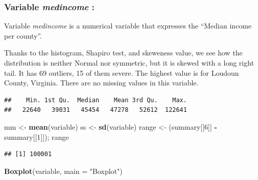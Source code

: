 \documentclass[
]{article}
\newenvironment{Shaded}{\begin{snugshade}}{\end{snugshade}}
\newcommand{\AttributeTok}[1]{\textcolor[rgb]{0.13,0.29,0.53}{#1}}
\newcommand{\DecValTok}[1]{\textcolor[rgb]{0.00,0.00,0.81}{#1}}
\newcommand{\FunctionTok}[1]{\textcolor[rgb]{0.13,0.29,0.53}{\textbf{#1}}}
\newcommand{\NormalTok}[1]{#1}
\newcommand{\OtherTok}[1]{\textcolor[rgb]{0.56,0.35,0.01}{#1}}
\newcommand{\SpecialCharTok}[1]{\textcolor[rgb]{0.81,0.36,0.00}{\textbf{#1}}}
\newcommand{\StringTok}[1]{\textcolor[rgb]{0.31,0.60,0.02}{#1}}
\begin{document}
\subsubsection{\texorpdfstring{Variable \emph{medincome}
:}{Variable medincome :}}\label{variable-medincome}

Variable \emph{medincome} is a numerical variable that expresses the
``Median income per county''.

Thanks to the histogram, Shapiro test, and skeweness value, we see how
the distribution is neither Normal nor symmetric, but it is skewed with
a long right tail. It has 69 outliers, 15 of them severe. The highest
value is for Loudoun County, Virginia. There are no missing values in
this variable.

\begin{Shaded}
\end{Shaded}

\begin{verbatim}
##    Min. 1st Qu.  Median    Mean 3rd Qu.    Max. 
##   22640   39031   45454   47278   52612  122641
\end{verbatim}

\begin{Shaded}
\begin{Highlighting}[]
\NormalTok{mm }\OtherTok{\textless{}{-}} \FunctionTok{mean}\NormalTok{(variable)}
\NormalTok{ss }\OtherTok{\textless{}{-}} \FunctionTok{sd}\NormalTok{(variable)}
\NormalTok{range }\OtherTok{\textless{}{-}}\NormalTok{ (summary[[}\DecValTok{6}\NormalTok{]] }\SpecialCharTok{{-}}\NormalTok{ summary[[}\DecValTok{1}\NormalTok{]]); range}
\end{Highlighting}
\end{Shaded}

\begin{verbatim}
## [1] 100001
\end{verbatim}

\begin{Shaded}
\begin{Highlighting}[]
\FunctionTok{Boxplot}\NormalTok{(variable, }\AttributeTok{main =} \StringTok{"Boxplot"}\NormalTok{)}
\end{Highlighting}
\end{Shaded}
\end{document}
